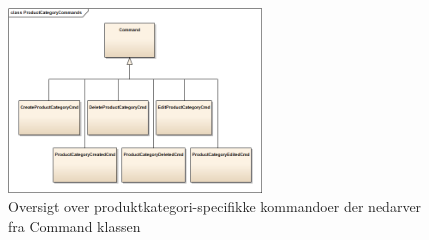 \begin{figure}[H]
    \centering
    \includegraphics[width=0.6\textwidth]{Systemdesign/SharedLib/Images/Commands/ProductCategoryCommands.png}
    \caption{Oversigt over produktkategori-specifikke kommandoer der nedarver fra Command klassen}
    \label{fig:klasseModelCata}
\end{figure}




